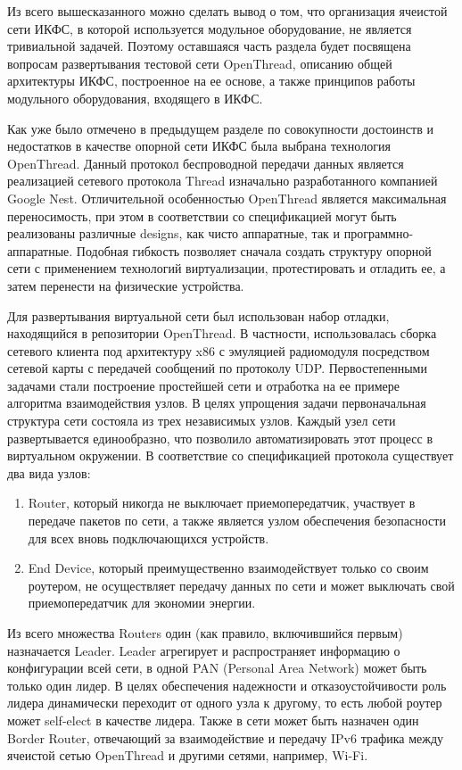 Из всего вышесказанного можно сделать вывод о том, что организация ячеистой сети ИКФС, в которой используется модульное оборудование, не является тривиальной задачей. Поэтому оставшаяся часть раздела будет посвящена вопросам развертывания тестовой сети OpenThread, описанию общей архитектуры ИКФС, построенное на ее основе, а также принципов работы модульного оборудования, входящего в ИКФС.

Как уже было отмечено в предыдущем разделе по совокупности достоинств и недостатков в качестве опорной сети ИКФС была выбрана технология OpenThread. Данный протокол беспроводной передачи данных является реализацией сетевого протокола Thread изначально разработанного компанией Google Nest. Отличительной особенностью OpenThread является максимальная переносимость, при этом в соответствии со спецификацией  могут быть реализованы различные designs, как чисто аппаратные, так и программно-аппаратные. Подобная гибкость позволяет сначала создать структуру опорной сети с применением технологий виртуализации, протестировать и отладить ее, а затем перенести на физические устройства.

Для развертывания виртуальной сети был использован набор отладки, находящийся в репозитории OpenThread. В частности, 	использовалась сборка сетевого клиента под архитектуру x86 с эмуляцией радиомодуля посредством сетевой карты с передачей сообщений по протоколу UDP. Первостепенными задачами стали построение простейшей сети и отработка на ее примере алгоритма взаимодействия узлов. В целях упрощения задачи первоначальная структура сети состояла из трех независимых узлов. Каждый узел сети развертывается единообразно, что позволило автоматизировать этот процесс в виртуальном окружении.
В соответствие со спецификацией протокола существует два вида узлов: 

\begin{enumerate}
	\item Router, который никогда не выключает приемопередатчик, участвует в передаче пакетов по сети, а также является узлом обеспечения безопасности для всех вновь подключающихся устройств.
	\item End Device, который преимущественно взаимодействует только со своим роутером, не осуществляет передачу данных по сети и может выключать свой приемопередатчик для экономии энергии.
\end{enumerate}

Из всего множества Routers один (как правило, включившийся первым) назначается Leader. Leader агрегирует и распространяет информацию о конфигурации всей сети, в одной PAN (Personal Area Network) может быть только один лидер.  В целях обеспечения надежности и отказоустойчивости роль лидера динамически переходит от одного узла к другому, то есть любой роутер может self-elect в качестве лидера. Также в сети может быть назначен один Border Router, отвечающий за взаимодействие и передачу IPv6 трафика между ячеистой сетью OpenThread и другими сетями, например, Wi-Fi.

